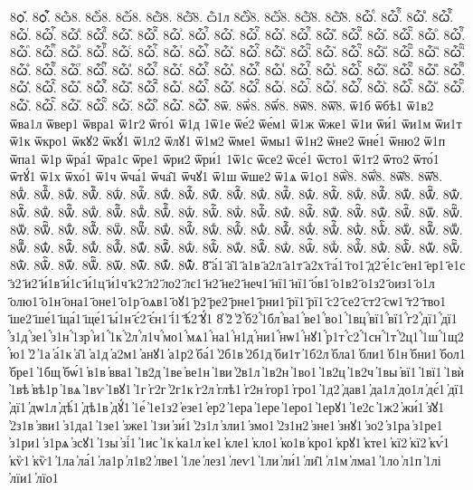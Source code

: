 {8ѻ꙽.
8ѻ꙽҇.
8ѽ8.
8ѽ̀8.
8ѽ́8.
8ѽ̈8.
8ѽ̑8.
ѽ1л
8ѽ҆̀8.
8ѽ҆́8.
8ѽ҆̈8.
8ѽ҆̑8.
8ѽⷠ.
8ѽⷠ҇.
8ѽⷡ.
8ѽⷡ҇.
8ѽⷢ.
8ѽⷢ҇.
8ѽⷣ.
8ѽⷣ҇.
8ѽⷤ.
8ѽⷤ҇.
8ѽⷥ.
8ѽⷥ҇.
8ѽⷦ.
8ѽⷦ҇.
8ѽⷧ.
8ѽⷧ҇.
8ѽⷨ.
8ѽⷨ҇.
8ѽⷩ.
8ѽⷩ҇.
8ѽⷪ.
8ѽⷪ҇.
8ѽⷫ.
8ѽⷫ҇.
8ѽⷬ.
8ѽⷬ҇.
8ѽⷭ.
8ѽⷭ҇.
8ѽⷮ.
8ѽⷮ҇.
8ѽⷯ.
8ѽⷯ҇.
8ѽⷰ.
8ѽⷰ҇.
8ѽⷱ.
8ѽⷱ҇.
8ѽⷲ.
8ѽⷲ҇.
8ѽⷳ.
8ѽⷳ҇.
8ѽⷴ.
8ѽⷴ҇.
8ѽⷵ.
8ѽⷵ҇.
8ѽⷶ.
8ѽⷶ҇.
8ѽⷷ.
8ѽⷷ҇.
8ѽⷸ.
8ѽⷸ҇.
8ѽⷹ.
8ѽⷹ҇.
8ѽⷺ.
8ѽⷺ҇.
8ѽⷻ.
8ѽⷻ҇.
8ѽⷼ.
8ѽⷼ҇.
8ѽⷽ.
8ѽⷽ҇.
8ѽⷾ.
8ѽⷾ҇.
8ѽⷿ.
8ѽⷿ҇.
8ѽꙴ.
8ѽꙴ҇.
8ѽꙵ.
8ѽꙵ҇.
8ѽꙶ.
8ѽꙶ҇.
8ѽꙷ.
8ѽꙷ҇.
8ѽꙸ.
8ѽꙸ҇.
8ѽꙹ.
8ѽꙹ҇.
8ѽꙺ.
8ѽꙺ҇.
8ѽꙻ.
8ѽꙻ҇.
8ѽ꙼.
8ѽ꙼҇.
8ѽ꙽.
8ѽ꙽҇.
8ѿ.
8ѿ̀8.
8ѿ́8.
8ѿ̈8.
8ѿ̑8.
ѿ1б
ѿбѣ1
ѿ1в2
ѿва1л
ѿвер1
ѿвра1
ѿ1г2
ѿго́1
ѿ1д
1ѿ1е
ѿе́2
ѿе́м1
ѿ1ж
ѿже1
ѿ1и
ѿи́1
ѿи1м
ѿи1т
ѿ1к
ѿкро1
ѿкꙋ2
ѿкꙋ́1
ѿ1л2
ѿлꙋ1
ѿ1м2
ѿме1
ѿмы1
ѿ1н2
ѿне2
ѿне́1
ѿню2
ѿ1п
ѿпа1
ѿ1р
ѿра́1
ѿра1с
ѿре1
ѿри2
ѿри́1
1ѿ1с
ѿсе2
ѿсе́1
ѿсто1
ѿ1т2
ѿто2
ѿто́1
ѿтꙋ́1
ѿ1х
ѿхо́1
ѿ1ч
ѿча́1
ѿча̑1
ѿчꙋ1
ѿ1ш
ѿше2
ѿ1ѧ
ѿ1ѻ1
8ѿ҆̀8.
8ѿ҆́8.
8ѿ҆̈8.
8ѿ҆̑8.
8ѿⷠ.
8ѿⷠ҇.
8ѿⷡ.
8ѿⷡ҇.
8ѿⷢ.
8ѿⷢ҇.
8ѿⷣ.
8ѿⷣ҇.
8ѿⷤ.
8ѿⷤ҇.
8ѿⷥ.
8ѿⷥ҇.
8ѿⷦ.
8ѿⷦ҇.
8ѿⷧ.
8ѿⷧ҇.
8ѿⷨ.
8ѿⷨ҇.
8ѿⷩ.
8ѿⷩ҇.
8ѿⷪ.
8ѿⷪ҇.
8ѿⷫ.
8ѿⷫ҇.
8ѿⷬ.
8ѿⷬ҇.
8ѿⷭ.
8ѿⷭ҇.
8ѿⷮ.
8ѿⷮ҇.
8ѿⷯ.
8ѿⷯ҇.
8ѿⷰ.
8ѿⷰ҇.
8ѿⷱ.
8ѿⷱ҇.
8ѿⷲ.
8ѿⷲ҇.
8ѿⷳ.
8ѿⷳ҇.
8ѿⷴ.
8ѿⷴ҇.
8ѿⷵ.
8ѿⷵ҇.
8ѿⷶ.
8ѿⷶ҇.
8ѿⷷ.
8ѿⷷ҇.
8ѿⷸ.
8ѿⷸ҇.
8ѿⷹ.
8ѿⷹ҇.
8ѿⷺ.
8ѿⷺ҇.
8ѿⷻ.
8ѿⷻ҇.
8ѿⷼ.
8ѿⷼ҇.
8ѿⷽ.
8ѿⷽ҇.
8ѿⷾ.
8ѿⷾ҇.
8ѿⷿ.
8ѿⷿ҇.
8ѿꙴ.
8ѿꙴ҇.
8ѿꙵ.
8ѿꙵ҇.
8ѿꙶ.
8ѿꙶ҇.
8ѿꙷ.
8ѿꙷ҇.
8ѿꙸ.
8ѿꙸ҇.
8ѿꙹ.
8ѿꙹ҇.
8ѿꙺ.
8ѿꙺ҇.
8ѿꙻ.
8ѿꙻ҇.
8ѿ꙼.
8ѿ꙼҇.
8ѿ꙽.
8ѿ꙽҇.
8҃
҃а́1
҃а̑1
҃а1в
҃а2л
҃а1т
҃а2х
҃га́1
҃го1
҃д2
҃е́1с
҃ен1
҃ер1
҃е1с
҃з2
҃и2
҃и́1в
҃и́1с
҃и́1ц
҃и́1ч
҃к2
҃л2
҃ло2
҃лє1
҃н2
҃не2
҃неч1
҃нї1
҃нї1
҃о́в1
҃о1в2
҃о1з2
҃оиз1
҃о1л
҃олю1
҃о1н
҃она1
҃оне1
҃о1р
҃оѧв1
҃оꙋ1
҃р2
҃ре2
҃рне1
҃рни1
҃рї1
҃рї1
҃с2
҃се2
҃ст2
҃сѡ1
҃т2
҃тво1
҃ше2
҃ше́1
҃ща́1
҃ще́1
҃ы́1н
҃є́2
҃є́н1
҃і́1
҃ѣ́2
҃ꙋ́1
8҆
҆2̀
҆2́
҆́б2
҆́1бл
҆́ва1
҆́ве1
҆́во1
҆́1вц
҆́вї1
҆́вї1
҆́г2
҆́дї1
҆́дї1
҆́з1д
҆́зе1
҆́з1н
҆́1зр
҆́и1
҆́1к
҆́2л
҆́л1ч
҆́мо1
҆́мѧ1
҆́на1
҆́н1д
҆́ни1
҆́нѡ1
҆́нꙋ1
҆́р1т
҆́с2
҆́1сн
҆́1т
҆́2ц1
҆́1ш
҆́1щ2
҆́ю1
҆2̑
҆1а
҆а́1к
҆а̑1
҆а1д
҆а2м1
҆анꙋ1
҆а1р2
҆ба́1
҆2б1в
҆2б1д
҆би1т
҆1б2л
҆бла1
҆бли1
҆б1н
҆бни1
҆бол1
҆бре1
҆1бщ
҆бѡ́1
҆в1в
҆вва1
҆1в2д
҆1ве
҆ве1н
҆1ви
҆2в1л
҆1в2н
҆1во1
҆1в2ц
҆1в2ч
҆1вы
҆вї1
҆1вї1
҆1вѝ
҆1вѣ
҆вѣ1р
҆1вѧ
҆1вѵ
҆1вꙋ1
҆1г
҆г2г
҆2г1к
҆г2л
҆глѣ1
҆г2н
҆гор1
҆гро1
҆1д2
҆дав1
҆да1л
҆до1л
҆дє́1
҆дї1
҆дї1
҆дѡ1л
҆дѣ́1
҆дѣ1в
҆дꙋ́1
҆1е́
҆1е1з2
҆езе1
҆ер2
҆1ера
҆1ере
҆1еро1
҆1ерꙋ1
҆1е2с
҆1ж2
҆жи́1
҆з̾ꙋ1
҆2з1в
҆зви1
҆з1да1
҆1зе1
҆зже1
҆1зи
҆зи́1
҆2з1л
҆зли1
҆змо1
҆2з1н2
҆зне1
҆знꙋ1
҆зо2
҆з1ра
҆з1ре1
҆з1ри1
҆з1рѧ
҆зсꙋ1
҆1зы
҆зі́1
҆1ис
҆1к
҆ка1л
҆ке1
҆кле1
҆кло1
҆ко1в
҆кро1
҆крꙋ1
҆кте1
҆кї2
҆кї2
҆кѵ́1
҆кѷ1
҆кѷ1
҆1ла
҆ла́1
҆ла1р
҆л1в2
҆лве1
҆1ле
҆лез1
҆леѵ1
҆1ли
҆ли́1
҆ли̑1
҆л1м
҆лма1
҆1ло
҆л1п
҆1лі
҆лїи1
҆лїо1
}
